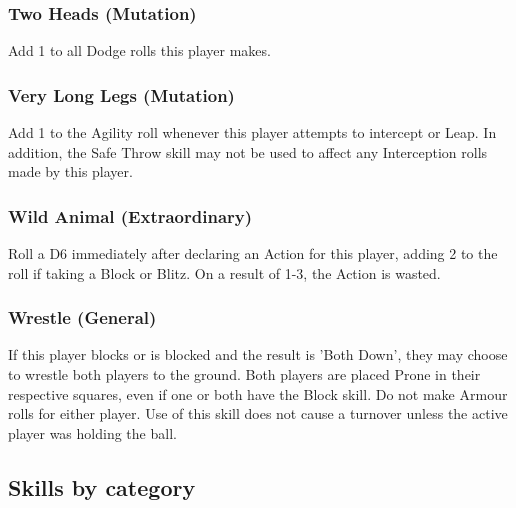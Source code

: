 \begin{multicols}{3}
\subsubsection{Two Heads (Mutation)}
\par Add 1 to all Dodge rolls this player makes.

\subsubsection{Very Long Legs (Mutation)}
\par Add 1 to the Agility roll whenever this player attempts to intercept or Leap. In addition, the Safe Throw skill may not be used to affect any Interception rolls made by this player.

\subsubsection{Wild Animal (Extraordinary)}
\par Roll a D6 immediately after declaring an Action for this player, adding 2 to the roll if taking a Block or Blitz. On a result of 1-3,  the Action is wasted.

\subsubsection{Wrestle (General)}
\par If this player blocks or is blocked and the result is 'Both Down', they may choose to wrestle both players to the ground. Both players are placed Prone in their respective squares, even if one or both have the Block skill. Do not make Armour rolls for either player. Use of this skill does not cause a turnover unless the active player was holding the ball.

\end{multicols}

\subsection{Skills by category}

